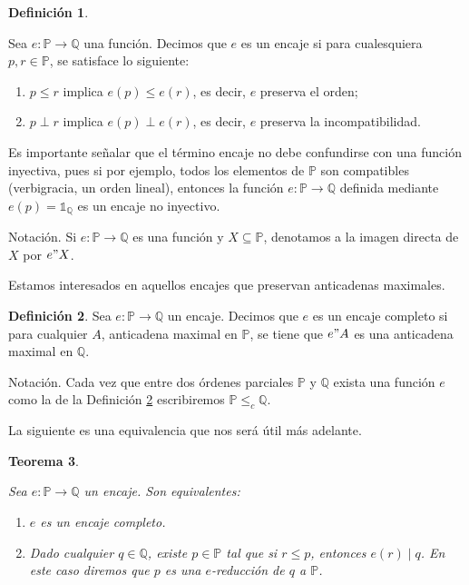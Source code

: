 \documentclass[11pt]{unam_tesis1}
\theoremstyle{MyThmStyle}
\theoremstyle{definition}
\newtheorem{definition}{Definici\'on}[chapter]
\theoremstyle{plain}
\newtheorem{theorem}[definition]{Teorema}
\theoremstyle{remark}
\let\leq\leqslant
\begin{document}
\begin{definition}\label{encaje}

Sea $e:\mathbb P\rightarrow \mathbb Q$ una funci\'on. Decimos que $e$ es un encaje si para cualesquiera $p,r\in \mathbb P$, se satisface lo siguiente:

\begin{enumerate}
\item $p\leq r$ implica $e(p)\leq e(r)$, es decir, $e$ preserva el orden;
\item $p\perp r$ implica $e(p)\perp e(r)$, es decir, $e$ preserva la incompatibilidad.

\end{enumerate}

\end{definition}

Es importante se\~nalar que el t\'ermino encaje no debe confundirse con una funci\'on inyectiva, pues si por ejemplo, todos los elementos de $\mathbb P$ son compatibles (verbigracia, un orden lineal), entonces la funci\'on $e:\mathbb P\to \mathbb Q$ definida mediante $e(p)=\mathds 1_{\mathbb Q}$ es un encaje no inyectivo.

Notaci\'on. Si $e:\mathbb P\to \mathbb Q$ es una funci\'on y $X\subseteq \mathbb P$, denotamos a la imagen directa de $X$ por $e"X$.

Estamos interesados en aquellos encajes que preservan anticadenas maximales.

\begin{definition}\label{encajecompleto}
Sea $e:\mathbb P\rightarrow \mathbb Q$ un encaje. Decimos que $e$ es un encaje completo si para cualquier $A$, anticadena maximal en $\mathbb P$, se tiene que $e"A$ es una anticadena maximal en $\mathbb Q$.
\end{definition}


Notaci\'on. Cada vez que entre dos \'ordenes parciales $\mathbb P$ y $\mathbb Q$ exista una funci\'on $e$ como la de la Definici\'on \ref{encajecompleto} escribiremos $\mathbb P\leq_c \mathbb Q$.

La siguiente es una equivalencia que nos ser\'a \'util m\'as adelante.

\begin{theorem}\label{equivalenciaencaje}

Sea $e:\mathbb P\rightarrow \mathbb Q$ un encaje. Son equivalentes:

\begin{enumerate}

\item $e$ es un encaje completo.
\item Dado cualquier $q\in \mathbb Q$, existe $p\in \mathbb P$ tal que si $r\leq p$, entonces $e(r)\mid q$. En este caso diremos que $p$ es una $e$-reducci\'on de $q$ a $\mathbb P$.

\end{enumerate}

\end{theorem}
\end{document}
